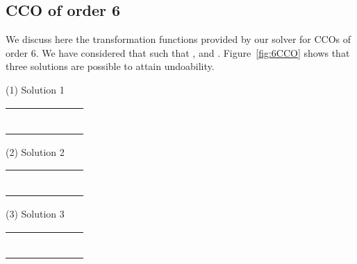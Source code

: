 \documentclass[submission,copyright,creativecommons]{eptcs}
\begin{document}
\subsection{CCO of order 6}
We discuss here the transformation functions provided by our solver 
for CCOs of order 6. We have considered that   such that ,  and  . Figure~\ref{fig:6CCO} shows that three solutions are possible to attain undoability.
\begin{table*}[htbp]\begin{scriptsize}
\hfill\hfill
   \begin{minipage}[t]{0.33\linewidth}
\centerline{(1) Solution 1}
      \centering 
   \begin{tabular}{|c|c|c|c|c|c|c|}
\hline
&   &   &  &     &  &  \\ \hline
& &  &&  & & \\ \hline 
& &  &&  &   &  \\ \hline 
& &  &&  & & \\ \hline
& &  &&  & &  \\ \hline
& &  &&  & &  \\ \hline
& &  &&  &  & \\ \hline
\end{tabular}
   \end{minipage}
   \hfill\hfill
   \begin{minipage}[t]{0.5\linewidth}
\centerline{(2)  Solution 2}
      \centering      
      \begin{tabular}{|c|c|c|c|c|c|c|}
\hline
&   &   &  &   &  &    \\ \hline
& &  &&  & & \\ \hline 
& &  &&  &  &  \\ \hline 
& &  &&  & &  \\ \hline
& &  &&  & & \\ \hline
& &  &&  & &  \\ \hline
& &  &&  & &  \\ \hline
\end{tabular}
   \end{minipage}
   \hfill \hfill
	 \begin{minipage}[t]{0.99\linewidth}
\centerline{(3) Solution 3}
      \centering 
   \begin{tabular}{|c|c|c|c|c|c|c|}
\hline
&   &   &  &   &  &   \\ \hline
& &  &&  & &  \\ \hline 
& &  &&  & &  \\ \hline 
& &  &&  &  &  \\ \hline
& &  &&  &  &  \\ \hline
& &  &&  & &  \\ \hline
& &  &&  & &  \\ \hline
\end{tabular}
   \end{minipage}
	\end{scriptsize}
   \label{fig:6CCO}
\end{table*}
\end{document}
